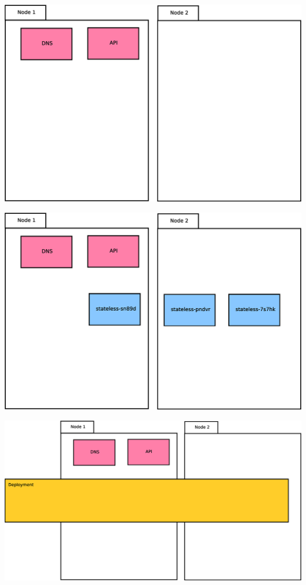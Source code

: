 \documentclass{beamer}
\begin{document}
\begin{frame}
\includegraphics[width=\textwidth,height=\textheight,keepaspectratio]{graphics/01-systemPods.eps}
\end{frame}

\begin{frame}
\includegraphics[width=\textwidth,height=\textheight,keepaspectratio]{graphics/02-statelessAppPods.eps}
\end{frame}

\begin{frame}
\includegraphics[width=\textwidth,height=\textheight,keepaspectratio]{graphics/03-deployment.eps}
\end{frame}
\end{document}
